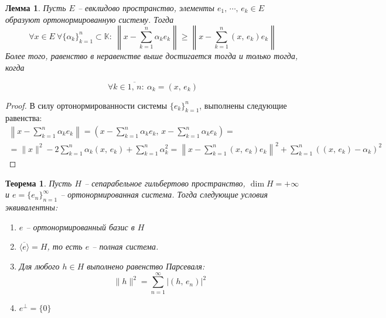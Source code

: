 \documentclass[a4paper,12pt]{article}
\renewcommand{\geq}{\ensuremath{\geqslant}}
\theoremstyle{plain}
\newtheorem{theorem}{Теорема}[section]
\newtheorem{lemma}{Лемма}[section]
\theoremstyle{definition}
\theoremstyle{remark}
\begin{document}
\begin{lemma}
	Пусть $E$ -- евклидово пространство, элементы $e_1,\,\cdots,\, e_k \in E$ образуют ортонормированную систему. Тогда
	\[
		\forall x \in E \: \forall \{\alpha_k\}_{k = 1}^n \subset \mathbb{K} :\: \left\|x - \sum_{k =1}^n\alpha_ke_k\right\| \geq \left\|x - \sum_{k = 1}^n(x,\,e_k)e_k\right\|
	\]
	Более того, равенство в неравенстве выше достигается тогда и только тогда, когда

	\[
		\forall k \in \overline{1,\, n} :\: \alpha_k = (x,\, e_k)
	\]
\end{lemma}

\begin{proof}
	В силу ортонормированности системы $\{e_k\}_{k = 1}^n$, выполнены следующие равенства:
	\begin{align*}
		\left\|x - \sum_{k=1}^n \alpha_ke_k\right\| = \left(x - \sum_{k = 1}^n\alpha_ke_k,\, x - \sum_{k = 1}^n \alpha_ke_k\right) = \\
		= \|x\|^2 - 2\sum_{k = 1}^n \alpha_k(x,\,e_k) + \sum_{k = 1}^n \alpha_k^2 = \left\|x - \sum_{k = 1}^n (x,\, e_k)e_k\right\|^2 + \sum_{k = 1}^n ((x,\, e_k) - \alpha_k)^2
	\end{align*}
\end{proof}

\begin{theorem}
	Пусть $H$ -- сепарабельное гильбертово пространство, $\dim H = +\infty$ и $e = \{e_n\}_{n=1}^\infty$ -- ортонормированная система. Тогда следующие условия эквивалентны:
	\begin{enumerate}
		\item $e$ -- ортонормированный базис в $H$
		\item $\overline{\langle e\rangle} = H$, то есть $e$ -- полная система.
		\item Для любого $h \in H$ выполнено равенство Парсеваля:
		      \[
			      \|h\|^2 = \sum_{n = 1}^\infty \vert (h,\, e_n)\vert^2
		      \]
		\item $e^\bot = \{0\}$
	\end{enumerate}
\end{theorem}
\end{document}
